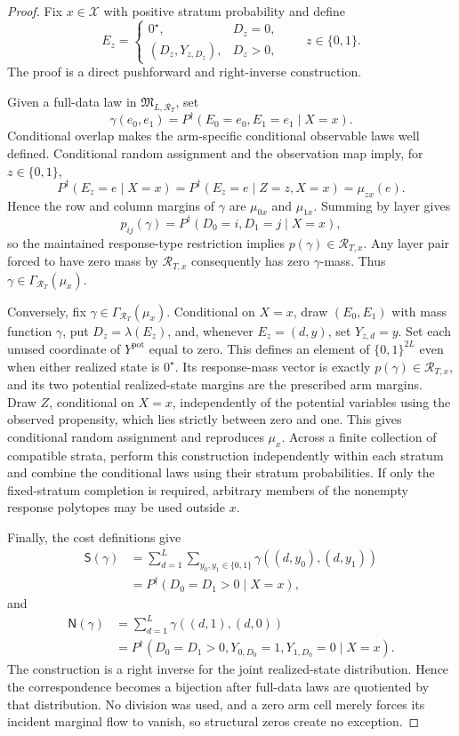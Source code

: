 \documentclass{article}
\begin{document}
\begin{proof}
Fix \(x\in\mathcal X\) with positive stratum probability and define
\[
 E_z=
 \begin{cases}
 0^{\star},&D_z=0,\\
 (D_z,Y_{z,D_z}),&D_z>0,
 \end{cases}
 \qquad z\in\{0,1\}.
\]
The proof is a direct pushforward and right-inverse construction.

Given a full-data law in \(\mathfrak M_{L,\mathcal R_T}\), set
\[
 \gamma(e_0,e_1)
 =P^{\dagger}(E_0=e_0,E_1=e_1\mid X=x).
\]
Conditional overlap makes the arm-specific conditional observable laws well defined.  Conditional random assignment and the observation map imply, for \(z\in\{0,1\}\),
\[
 P^{\dagger}(E_z=e\mid X=x)
 =P^{\dagger}(E_z=e\mid Z=z,X=x)
 =\mu_{zx}(e).
\]
Hence the row and column margins of \(\gamma\) are \(\mu_{0x}\) and \(\mu_{1x}\).  Summing by layer gives
\[
 p_{ij}(\gamma)
 =P^{\dagger}(D_0=i,D_1=j\mid X=x),
\]
so the maintained response-type restriction implies \(p(\gamma)\in\mathcal R_{T,x}\).  Any layer pair forced to have zero mass by \(\mathcal R_{T,x}\) consequently has zero \(\gamma\)-mass.  Thus \(\gamma\in\Gamma_{\mathcal R_T}(\mu_x)\).

Conversely, fix \(\gamma\in\Gamma_{\mathcal R_T}(\mu_x)\).  Conditional on \(X=x\), draw \((E_0,E_1)\) with mass function \(\gamma\), put \(D_z=\lambda(E_z)\), and, whenever \(E_z=(d,y)\), set \(Y_{z,d}=y\).  Set each unused coordinate of \(Y^{\mathrm{pot}}\) equal to zero.  This defines an element of \(\{0,1\}^{2L}\) even when either realized state is \(0^{\star}\).  Its response-mass vector is exactly \(p(\gamma)\in\mathcal R_{T,x}\), and its two potential realized-state margins are the prescribed arm margins.  Draw \(Z\), conditional on \(X=x\), independently of the potential variables using the observed propensity, which lies strictly between zero and one.  This gives conditional random assignment and reproduces \(\mu_x\).  Across a finite collection of compatible strata, perform this construction independently within each stratum and combine the conditional laws using their stratum probabilities.  If only the fixed-stratum completion is required, arbitrary members of the nonempty response polytopes may be used outside \(x\).

Finally, the cost definitions give
\[
 \begin{aligned}
 \mathsf S(\gamma)
 &=\sum_{d=1}^{L}\sum_{y_0,y_1\in\{0,1\}}
 \gamma((d,y_0),(d,y_1))\\
 &=P^{\dagger}(D_0=D_1>0\mid X=x),
 \end{aligned}
\]
and
\[
 \begin{aligned}
 \mathsf N(\gamma)
 &=\sum_{d=1}^{L}\gamma((d,1),(d,0))\\
 &=P^{\dagger}(D_0=D_1>0,
 Y_{0,D_0}=1,Y_{1,D_0}=0\mid X=x).
 \end{aligned}
\]
The construction is a right inverse for the joint realized-state distribution.  Hence the correspondence becomes a bijection after full-data laws are quotiented by that distribution.  No division was used, and a zero arm cell merely forces its incident marginal flow to vanish, so structural zeros create no exception.
\end{proof}
\end{document}
